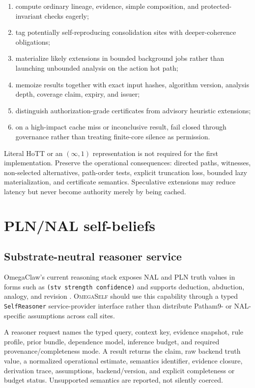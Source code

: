 \documentclass[11pt,oneside]{report}
\newcommand{\systemname}{\textsc{OmegaSelf}}
\begin{document}
\begin{enumerate}
  \item compute ordinary lineage, evidence, simple composition, and protected-invariant checks eagerly;
  \item tag potentially self-reproducing consolidation sites with deeper-coherence obligations;
  \item materialize likely extensions in bounded background jobs rather than launching unbounded analysis on the action hot path;
  \item memoize results together with exact input hashes, algorithm version, analysis depth, coverage claim, expiry, and issuer;
  \item distinguish authorization-grade certificates from advisory heuristic extensions;
  \item on a high-impact cache miss or inconclusive result, fail closed through governance rather than treating finite-core silence as permission.
\end{enumerate}

\begin{researchbox}
Literal HoTT or an $(\infty,1)$ representation is not required for the first implementation. Preserve the operational consequences: directed paths, witnesses, non-selected alternatives, path-order tests, explicit truncation loss, bounded lazy materialization, and certificate semantics. Speculative extensions may reduce latency but never become authority merely by being cached.
\end{researchbox}

\chapter{PLN/NAL self-beliefs}

\section{Substrate-neutral reasoner service}

OmegaClaw's current reasoning stack exposes NAL and PLN truth values in forms such as \texttt{(stv strength confidence)} and supports deduction, abduction, analogy, and revision \cite{omegaclaw-reasoning}. \systemname{} should use this capability through a typed \texttt{SelfReasoner} service-provider interface rather than distribute Patham9- or NAL-specific assumptions across call sites.

A reasoner request names the typed query, context key, evidence snapshot, rule profile, prior bundle, dependence model, inference budget, and required provenance/completeness mode. A result returns the claim, raw backend truth value, a normalized operational estimate, semantics identifier, evidence closure, derivation trace, assumptions, backend/version, and explicit completeness or budget status. Unsupported semantics are reported, not silently coerced.
\end{document}
